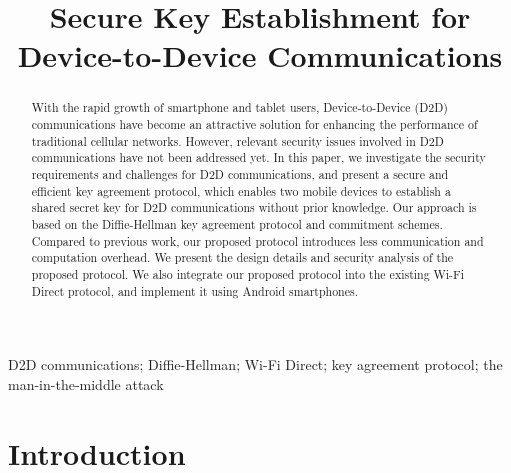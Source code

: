 \documentclass[conference]{IEEEtran}
\begin{document}
\title{Secure Key Establishment for Device-to-Device Communications}

\author{}




\maketitle


\begin{abstract}

With the rapid growth of smartphone and tablet users, Device-to-Device (D2D) communications have become an attractive solution for enhancing the performance of traditional cellular networks. However, relevant security issues involved in D2D communications have not been addressed yet. In this paper, we investigate the security requirements and challenges for D2D communications, and present a secure and efficient key agreement protocol, which enables two mobile devices to establish a shared secret key for D2D communications without prior knowledge. Our approach is based on the Diffie-Hellman key agreement protocol and commitment schemes. Compared to previous work, our proposed protocol introduces less communication and computation overhead. We present the design details and security analysis of the proposed protocol. We also integrate our proposed protocol into the existing Wi-Fi Direct protocol, and implement it using Android smartphones.

\end{abstract}

\begin{IEEEkeywords}
D2D communications; Diffie-Hellman; Wi-Fi Direct; key agreement protocol; the man-in-the-middle attack
\end{IEEEkeywords}

\IEEEpeerreviewmaketitle



\section{Introduction}
\end{document}
